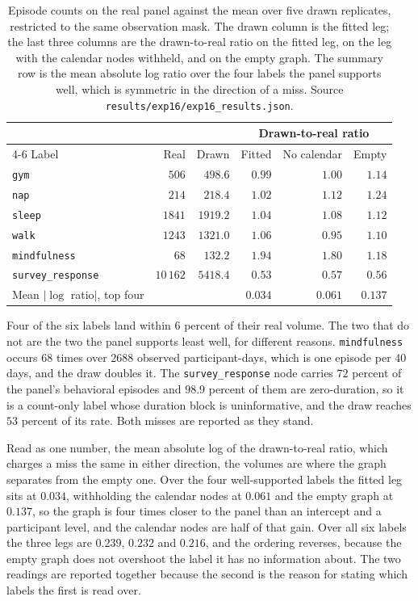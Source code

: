 \begin{table}[t]
\centering
\caption{Episode counts on the real panel against the mean over five drawn
replicates, restricted to the same observation mask. The drawn column is the
fitted leg; the last three columns are the drawn-to-real ratio on the fitted
leg, on the leg with the calendar nodes withheld, and on the empty graph. The
summary row is the mean absolute log ratio over the four labels the panel
supports well, which is symmetric in the direction of a miss. Source
\texttt{results/exp16/exp16\_results.json}.}
\label{tab:results:arm1_volume}
\small
\begin{tabular}{lrrrrr}
\toprule
 & & & \multicolumn{3}{c}{Drawn-to-real ratio} \\
\cmidrule(lr){4-6}
Label & Real & Drawn & Fitted & No calendar & Empty \\
\midrule
\texttt{gym} & $506$ & $498.6$ & $0.99$ & $1.00$ & $1.14$ \\
\texttt{nap} & $214$ & $218.4$ & $1.02$ & $1.12$ & $1.24$ \\
\texttt{sleep} & $1841$ & $1919.2$ & $1.04$ & $1.08$ & $1.12$ \\
\texttt{walk} & $1243$ & $1321.0$ & $1.06$ & $0.95$ & $1.10$ \\
\texttt{mindfulness} & $68$ & $132.2$ & $1.94$ & $1.80$ & $1.18$ \\
\texttt{survey\_response} & $10\,162$ & $5418.4$ & $0.53$ & $0.57$ & $0.56$ \\
\midrule
Mean $|\log$ ratio$|$, top four & & & $\mathbf{0.034}$ & $0.061$ & $0.137$ \\
\bottomrule
\end{tabular}
\end{table}

Four of the six labels land within $6$ percent of their real volume. The two
that do not are the two the panel supports least well, for different reasons.
\texttt{mindfulness} occurs $68$ times over $2688$ observed participant-days,
which is one episode per $40$ days, and the draw doubles it. The
\texttt{survey\_response} node carries $72$ percent of the panel's behavioral
episodes and $98.9$ percent of them are zero-duration, so it is a count-only
label whose duration block is uninformative, and the draw reaches $53$ percent
of its rate. Both misses are reported as they stand.

Read as one number, the mean absolute log of the drawn-to-real ratio, which
charges a miss the same in either direction, the volumes are where the graph
separates from the empty one. Over the four well-supported labels the fitted
leg sits at $0.034$, withholding the calendar nodes at $0.061$ and the empty
graph at $0.137$, so the graph is four times closer to the panel than an
intercept and a participant level, and the calendar nodes are half of that
gain. Over all six labels the three legs are $0.239$, $0.232$ and $0.216$, and
the ordering reverses, because the empty graph does not overshoot the label it
has no information about. The two readings are reported together because the
second is the reason for stating which labels the first is read over.

